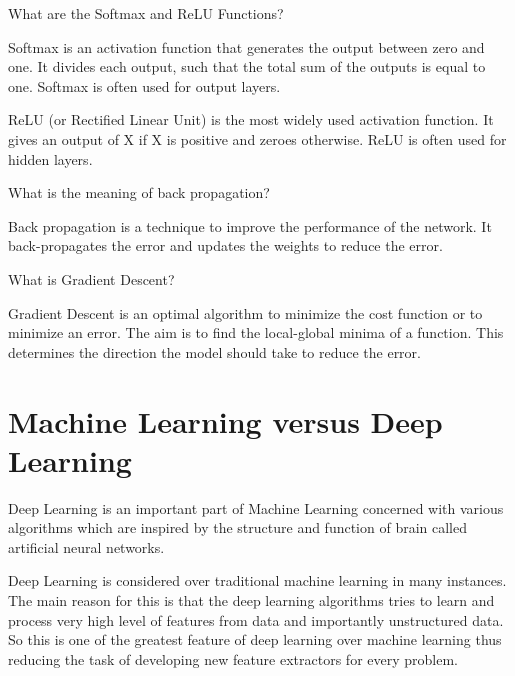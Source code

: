 	\begin{qanda}
		\begin{question}
What are the Softmax and ReLU Functions?
		\end{question}
		\begin{answer}
Softmax is an activation function that generates the output between zero and one. It divides each output, such that the total sum of the outputs is equal to one. Softmax is often used for output layers.

ReLU (or Rectified Linear Unit) is the most widely used activation function. It gives an output of X if X is positive and zeroes otherwise. ReLU is often used for hidden layers.%
		\end{answer}
	\end{qanda}

	\begin{qanda}
		\begin{question}
What is the meaning of back propagation?
		\end{question}
		\begin{answer}
Back propagation is a technique to improve the performance of the network. It back-propagates the error and updates the weights to reduce the error.
		\end{answer}
	\end{qanda}

	\begin{qanda}
		\begin{question}
What is Gradient Descent?
		\end{question}
		\begin{answer}
Gradient Descent is an optimal algorithm to minimize the cost function or to minimize an error. The aim is to find the local-global minima of a function. This determines the direction the model should take to reduce the error.
		\end{answer}
	\end{qanda}

	\section{Machine Learning versus Deep Learning}

	\begin{bulletedlist}
		\item Deep Learning is an important part of Machine Learning concerned with various algorithms which are inspired by the structure and function of brain called artificial
neural networks.
		\item Deep Learning is considered over traditional machine learning in many instances. The main reason for this is that the deep learning algorithms tries to learn and process very
high level of features from data and importantly unstructured data. So this is one of the greatest feature of deep learning over machine learning thus reducing the task of developing new feature extractors for every problem.
	\end{bulletedlist}

